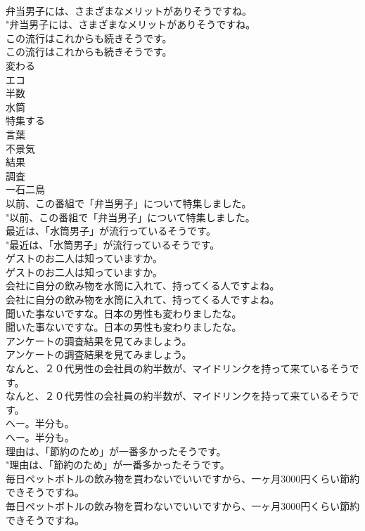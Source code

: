 \documentclass[8pt]{extreport}
\begin{document}
\begin{CJK}{UTF8}{min}
\\	弁当男子には、さまざまなメリットがありそうですね。	
\\	"弁当男子には、さまざまなメリットがありそうですね。 
\\	この流行はこれからも続きそうです。	
\\	この流行はこれからも続きそうです。 
\\	変わる
\\	エコ
\\	半数
\\	水筒
\\	特集する
\\	言葉
\\	不景気
\\	結果
\\	調査
\\	一石二鳥
\\	以前、この番組で「弁当男子」について特集しました。	
\\	"以前、この番組で「弁当男子」について特集しました。 
\\	最近は、「水筒男子」が流行っているそうです。	
\\	"最近は、「水筒男子」が流行っているそうです。 
\\	ゲストのお二人は知っていますか。	
\\	ゲストのお二人は知っていますか。 
\\	会社に自分の飲み物を水筒に入れて、持ってくる人ですよね。	
\\	会社に自分の飲み物を水筒に入れて、持ってくる人ですよね。 
\\	聞いた事ないですな。日本の男性も変わりましたな。	
\\	聞いた事ないですな。日本の男性も変わりましたな。 
\\	アンケートの調査結果を見てみましょう。	
\\	アンケートの調査結果を見てみましょう。 
\\	なんと、２０代男性の会社員の約半数が、マイドリンクを持って来ているそうです。	
\\	なんと、２０代男性の会社員の約半数が、マイドリンクを持って来ているそうです。 
\\	へー。半分も。	
\\	へー。半分も。 
\\	理由は、「節約のため」が一番多かったそうです。	
\\	"理由は、「節約のため」が一番多かったそうです。 
\\	毎日ペットボトルの飲み物を買わないでいいですから、一ヶ月3000円くらい節約できそうですね。	
\\	毎日ペットボトルの飲み物を買わないでいいですから、一ヶ月3000円くらい節約できそうですね。 

\end{CJK}
\end{document}
